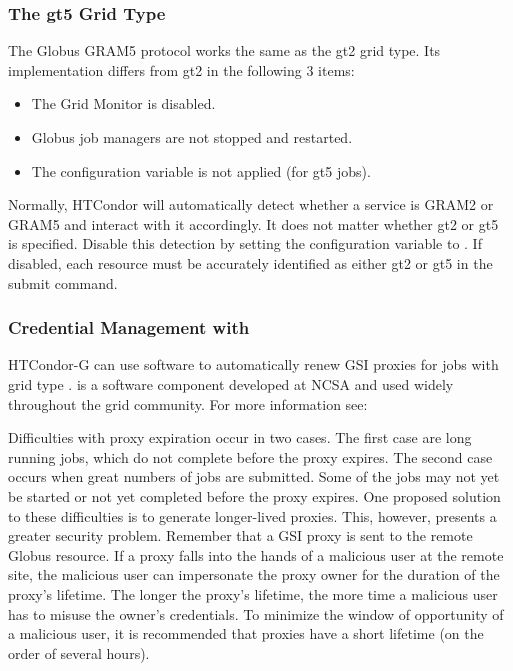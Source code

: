\subsubsection{\label{sec:Using-gt5}The gt5 Grid Type}


The Globus GRAM5 protocol works the same as the gt2 grid type.
Its implementation differs from gt2 in the following 3 items:
\begin{itemize}
\item
The Grid Monitor is disabled.
\item
Globus job managers are not stopped and restarted. 
\item
The configuration variable  
is not applied (for gt5 jobs).
\end{itemize}

Normally, HTCondor will automatically detect whether a service is GRAM2 or
GRAM5 and interact with it accordingly. 
It does not matter whether gt2 or gt5 is specified. 
Disable this detection by setting
the configuration variable  to .
If disabled, each resource must be accurately identified as either gt2 or gt5
in the  submit command.

\subsubsection{\label{sec:My-Proxy}Credential Management with }
HTCondor-G can use 
software to automatically renew GSI proxies for
 jobs with grid type
.
 is a software component developed at
NCSA and used widely throughout the grid community.
For more information see:

Difficulties with proxy expiration occur in two cases.
The first case are long running jobs, which do not complete
before the proxy expires.
The second case occurs when great numbers of jobs are submitted.
Some of the jobs may not yet be started
or not yet completed before the proxy expires.
One proposed solution to these difficulties is to generate
longer-lived proxies.
This, however, presents a greater security problem.
Remember that a GSI proxy is sent to the remote Globus resource.
If a proxy falls into the hands of a malicious user at the remote site,
the malicious user can impersonate the proxy owner
for the duration of the proxy's lifetime.
The longer the proxy's lifetime,
the more time a malicious user has to misuse the owner's credentials.
To minimize the
window of opportunity of a
malicious user, 
it is recommended that proxies have a short lifetime
(on the order of several hours).

